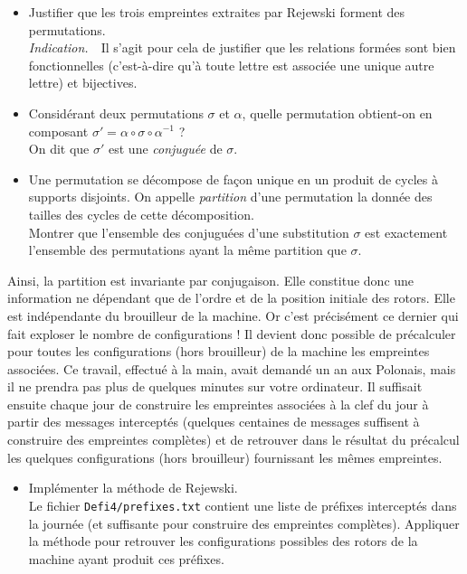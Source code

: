 \documentclass[11pt, a4paper]{article}
\begin{document}
\begin{itemize}
\item[\polygona] Justifier que les trois empreintes extraites par Rejewski forment des
  permutations.\\
  \emph{Indication.}~~Il s'agit pour cela de justifier que les relations
  formées sont bien fonctionnelles (c'est-à-dire qu'à toute lettre est
  associée une unique autre lettre) et bijectives.
\item Considérant deux permutations $\sigma$ et $\alpha$, quelle
  permutation obtient-on en composant
  $\sigma'=\alpha\circ\sigma\circ\alpha^{-1}$ ?\\
On dit que $\sigma'$ est une \emph{conjuguée} de $\sigma$.
\item[\polygonc] Une permutation se décompose de façon unique en un produit de cycles à supports disjoints. On appelle \emph{partition} d'une permutation la donnée des
  tailles des cycles de cette décomposition.\\%
  Montrer que l'ensemble des conjuguées d'une
  substitution $\sigma$ est exactement l'ensemble des permutations
  ayant la même partition que $\sigma$.\\
\end{itemize}

\noindent Ainsi, la partition est invariante par conjugaison. Elle constitue donc une information ne dépendant
que de l'ordre et de la position initiale des rotors. Elle est
indépendante du brouilleur de la machine. Or c'est précisément ce dernier qui fait exploser le nombre
de configurations ! Il devient donc possible de précalculer pour
toutes les configurations (hors brouilleur) de la machine les
empreintes associées. Ce travail, effectué à la main, avait demandé un an
aux Polonais, mais il ne prendra pas plus de quelques minutes sur votre
ordinateur. Il suffisait ensuite chaque jour de construire les
empreintes associées à la clef du jour à partir des messages
interceptés (quelques centaines de messages suffisent à
construire des empreintes complètes) et de retrouver dans le résultat du précalcul les quelques
configurations (hors brouilleur) fournissant les mêmes
empreintes.

\vspace{0.2cm}

\begin{itemize}
\item[\polygond] Implémenter la méthode de Rejewski.\\
  Le fichier \texttt{Defi4/prefixes.txt} contient une liste de préfixes interceptés dans la journée (et suffisante pour construire des empreintes complètes). Appliquer la méthode pour retrouver les configurations possibles des rotors de la machine ayant produit ces préfixes.
\end{itemize}
\end{document}
